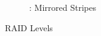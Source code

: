 \begin{figure}[h!tbp]
\begin{subfigure}{0.45\linewidth}
    \caption{: Mirrored Stripes}
    \label{subfig:RAID_01}
  \end{subfigure}
  \caption{RAID Levels}
  \label{fig:RAID_Levels}
\end{figure}


